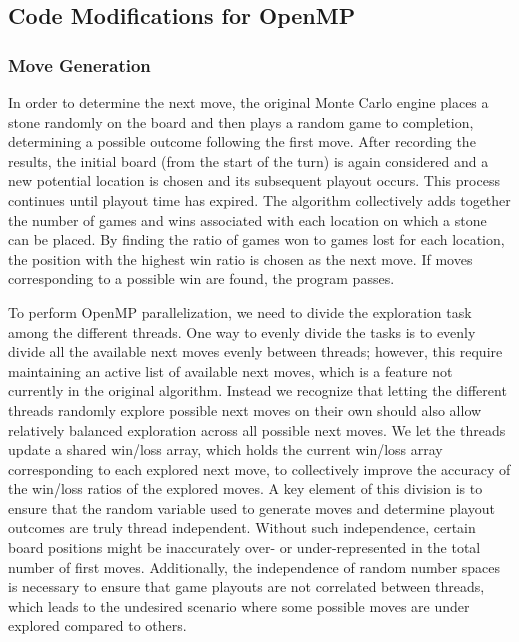 \documentclass[nocopyrightspace, 10pt]{sigplanconf}
\begin{document}
\subsection{Code Modifications for OpenMP}

\subsubsection{Move Generation}

In order to determine the next move, the original Monte Carlo engine places a stone randomly on the board and then plays a random game to completion, determining a possible outcome following the first move.  After recording the results, the initial board (from the start of the turn) is again considered and a new potential location is chosen and its subsequent playout occurs.  This process continues until playout time has expired.  The algorithm collectively adds together the number of games and wins associated with each location on which a stone can be placed.  %
By finding the ratio of games won to games lost for each location, the position with the highest win ratio is chosen as the next move.   If moves corresponding to a possible win are found, the program passes.

To perform OpenMP parallelization, we need to divide the exploration task among the different threads. One way to evenly divide the tasks is to evenly divide all the available next moves evenly between threads; however, this require maintaining an active list of available next moves, which is a feature not currently in the original algorithm.  Instead we recognize that letting the different threads randomly explore possible next moves on their own should also allow relatively balanced exploration across all possible next moves. We let the threads update a shared win/loss array, which holds the current win/loss array corresponding to each explored next move, to collectively improve the accuracy of the win/loss ratios of the explored moves. A key element of this division is to ensure that the random variable used to generate moves and determine playout outcomes are truly thread independent.  Without such independence, certain board positions might be inaccurately over- or under-represented in the total number of first moves.  Additionally, the independence of random number spaces is necessary to ensure that game playouts are not correlated between threads, which leads to the undesired scenario where some possible moves are under explored compared to others.
\end{document}
